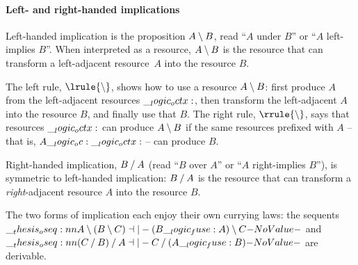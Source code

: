 \paragraph*{Left- and right-handed implications}
Left-handed implication is the proposition $A \mathbin { \setminus } B$, read \enquote{$A$ under $B$} or \enquote{$A$ left-implies $B$}.
When interpreted as a resource, $A \mathbin { \setminus } B$ is the resource that can transform a left-adjacent resource~$A$ into the resource $B$.
The left rule, $\lrule{\limp}$, shows how to use a resource $A \mathbin { \setminus } B$: first produce $A$ from the left-adjacent resources $\__logic_octx:$, then transform the left-adjacent $A$ into the resource $B$, and finally use that $B$.
The right rule, $\rrule{\limp}$, says that resources $\__logic_octx:$ can produce $A \mathbin { \setminus } B$ if the same resources prefixed with $A$ -- that is, $A \__logic_oc: \__logic_octx:$ -- can produce $B$.

Right-handed implication, $B \mathbin { / } A$ (read \enquote{$B$ over $A$} or \enquote{$A$ right-implies $B$}), is symmetric to left-handed implication: $B \mathbin { / } A$ is the resource that can transform a \emph{right}-adjacent resource $A$ into the resource $B$.

The two forms of implication each enjoy their own currying laws: the sequents $\oseq{A \limp (B \limp C) \dashv|- (B \fuse A) \limp C}$ and $\oseq{(C \pmir B) \pmir A \dashv|- C \pmir (A \fuse B)}$ are derivable.




